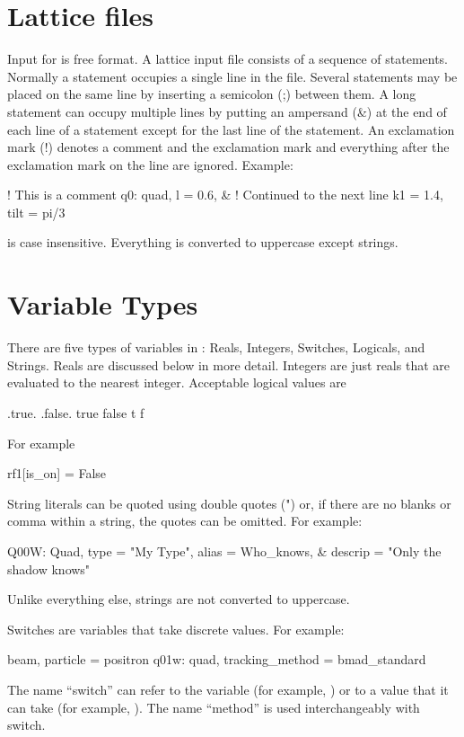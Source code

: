 \section{Lattice files}

Input for \bmad is free format. A \bmad lattice input file consists
of a sequence of statements. Normally a statement occupies a single
line in the file. Several statements may be placed on the same line by
inserting a semicolon (;) between them. A long statement can occupy
multiple lines by putting an ampersand (\&) at the end of each line of
a statement except for the last line of the statement. An
exclamation mark (!) denotes a comment and the exclamation mark and
everything after the exclamation mark on the line are ignored. Example:
\begin{example}
  ! This is a comment
  q0: quad, l = 0.6, &     ! Continued to the next line
            k1 = 1.4, tilt = pi/3
\end{example}
\bmad is case insensitive. Everything is converted to uppercase except
strings.

\section{Variable Types}

There are five types of variables in \bmad: Reals, Integers, Switches, 
Logicals, and 
Strings. Reals are discussed below in more detail. Integers are just reals
that are evaluated to the nearest integer. Acceptable logical values are
\begin{example}
  .true.  .false.
   true    false
   t       f
\end{example}
For example
\begin{example}
  rf1[is_on] = False
\end{example}

\vskip0.1in
String literals can be quoted using double quotes (") or, if there are no
blanks or comma within a string, the quotes can be omitted. For example:
\begin{example}
  Q00W: Quad, type = "My Type", alias = Who_knows, &
                                  descrip = "Only the shadow knows"
\end{example}
Unlike everything else, strings are not converted to uppercase.

Switches are variables that take discrete values. For example:
\begin{example}
  beam, particle = positron                    
  q01w: quad, tracking\_method = bmad\_standard 
\end{example}
The name ``switch'' can refer to the variable (for example,
) or to a value that it can take (for example,
). The name ``method'' is used interchangeably with switch.

